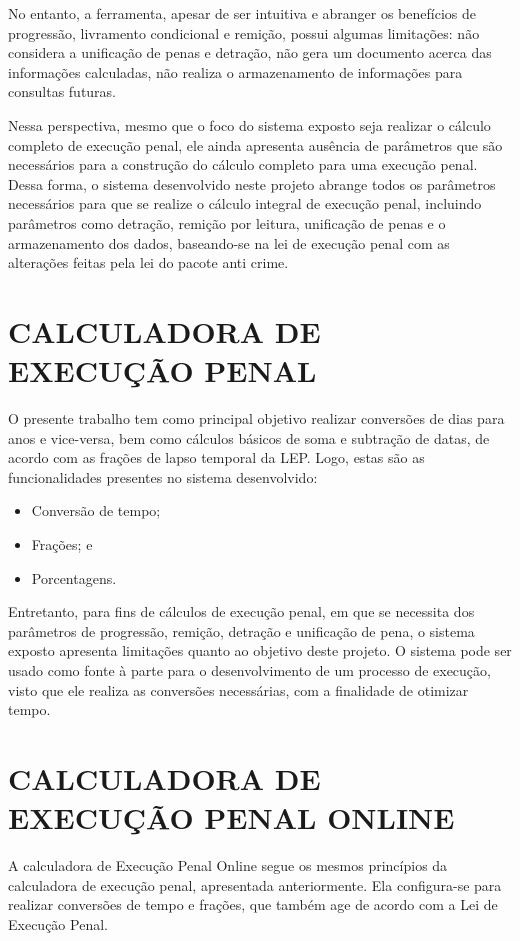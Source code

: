 No entanto, a ferramenta, apesar de ser intuitiva e abranger os benefícios de progressão, livramento condicional e remição, possui algumas limitações: não considera a unificação de penas e detração, não gera um documento acerca das informações calculadas, não realiza o armazenamento de informações para consultas futuras.

Nessa perspectiva, mesmo que o foco do sistema exposto seja realizar o cálculo completo de execução penal, ele ainda apresenta ausência de parâmetros que são necessários para a construção do cálculo completo para uma execução penal. Dessa forma, o sistema desenvolvido neste projeto abrange todos os parâmetros necessários para que se realize o cálculo integral de execução penal, incluindo parâmetros como detração, remição por leitura, unificação de penas e o armazenamento dos dados, baseando-se na lei de execução penal com as alterações feitas pela lei do pacote anti crime.\cite{lep, pacoteAnticrime}

\section{CALCULADORA DE EXECUÇÃO PENAL}
O presente trabalho tem como principal objetivo realizar conversões de dias para anos e vice-versa, bem como cálculos básicos de soma e subtração de datas, de acordo com as frações de lapso temporal da LEP. Logo, estas são as funcionalidades presentes no sistema desenvolvido:\cite{fernandoCruzCalc, lep}

\begin{itemize}
    \item Conversão de tempo;
    \item Frações; e
    \item Porcentagens.
\end{itemize}

Entretanto, para fins de cálculos de execução penal, em que se necessita dos parâmetros de progressão, remição, detração e unificação de pena, o sistema exposto apresenta limitações quanto ao objetivo deste projeto. O sistema pode ser usado como fonte à parte para o desenvolvimento de um processo de execução, visto que ele realiza as conversões necessárias, com a finalidade de otimizar tempo.


\section{CALCULADORA DE EXECUÇÃO PENAL ONLINE}
A calculadora de Execução Penal Online segue os mesmos princípios da calculadora de execução penal, apresentada anteriormente. Ela configura-se para realizar conversões de tempo e frações, que também age de acordo com a Lei de Execução Penal.\cite{saraBarbozaCalc}

